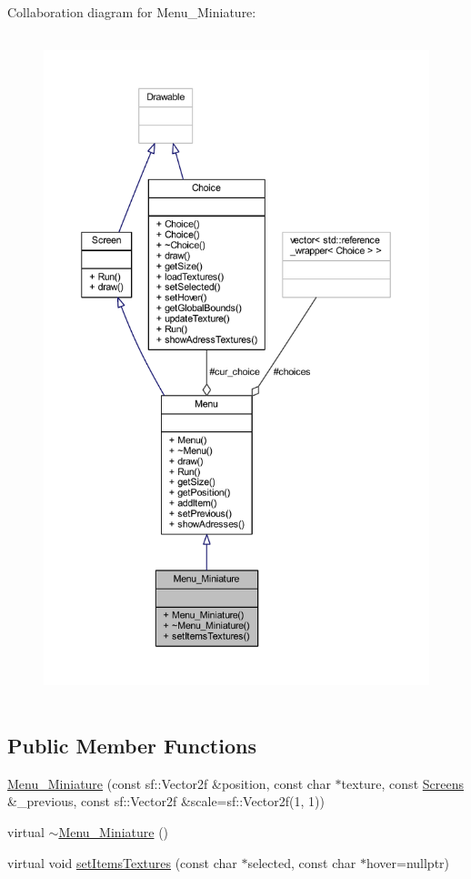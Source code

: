 Collaboration diagram for Menu\+\_\+\+Miniature\+:
\nopagebreak
\begin{figure}[H]
\begin{center}
\leavevmode
\includegraphics[height=550pt]{class_menu___miniature__coll__graph}
\end{center}
\end{figure}
\subsection*{Public Member Functions}
\begin{DoxyCompactItemize}
\item 
\hyperlink{class_menu___miniature_a9bc0436adab538cddc4074003d324a82}{Menu\+\_\+\+Miniature} (const sf\+::\+Vector2f \&position, const char $\ast$texture, const \hyperlink{_globals_8h_a3d5776bab98402b03be09156bacf4f68}{Screens} \&\+\_\+previous, const sf\+::\+Vector2f \&scale=sf\+::\+Vector2f(1, 1))
\item 
virtual \hyperlink{class_menu___miniature_a6893bda2d8bc8f29ac0646e976082515}{$\sim$\+Menu\+\_\+\+Miniature} ()
\item 
virtual void \hyperlink{class_menu___miniature_afad04c066c7e436bbf9cccde310d07dc}{set\+Items\+Textures} (const char $\ast$selected, const char $\ast$hover=nullptr)
\end{DoxyCompactItemize}
